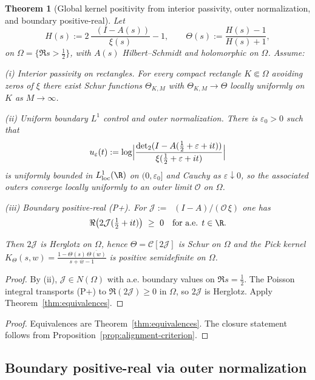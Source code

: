\documentclass[11pt]{article}
\newtheorem{theorem}{Theorem}
\theoremstyle{remark}
\DeclareMathOperator{\dettwo}{det_2}
\begin{document}
\begin{theorem}[Global kernel positivity from interior passivity, outer normalization, and boundary positive-real]\label{thm:global-PSD}
Let
\[
  H(s):=2\,\frac{\dettwo(I-A(s))}{\xi(s)}-1,\qquad
  \Theta(s):=\frac{H(s)-1}{H(s)+1},
\]
on \(\Omega=\{\Re s>\tfrac12\}\), with $A(s)$ Hilbert--Schmidt and holomorphic on \(\Omega\).
Assume:

\emph{(i) Interior passivity on rectangles.} For every compact rectangle $K\Subset\Omega$ avoiding zeros of \(\xi\) there exist Schur functions \(\Theta_{K,M}\) with \(\Theta_{K,M}\to\Theta\) locally uniformly on $K$ as $M\to\infty$.

\emph{(ii) Uniform boundary $L^1$ control and outer normalization.} There is \(\varepsilon_0>0\) such that
\[
  u_\varepsilon(t):=\log\Bigl|\frac{\dettwo(I-A(\tfrac12+\varepsilon+it))}{\xi(\tfrac12+\varepsilon+it)}\Bigr|
\]
is uniformly bounded in $L^1_{\mathrm{loc}}(\R)$ on $(0,\varepsilon_0]$ and Cauchy as \(\varepsilon\downarrow0\), so the associated outers converge locally uniformly to an outer limit \(\mathcal O\) on \(\Omega\).

\emph{(iii) Boundary positive-real (P+).} For \(\mathcal J:=\dettwo(I-A)/(\mathcal O\,\xi)\) one has
\[
 \Re\big(2\mathcal J(\tfrac12+it)\big)\ \ge\ 0\quad\text{for a.e. }t\in\R.
\]

Then \(2\mathcal J\) is Herglotz on \(\Omega\), hence \(\Theta=\mathcal C[2\mathcal J]\) is Schur on \(\Omega\) and the Pick kernel
\(
  K_\Theta(s,w)=\frac{1-\Theta(s)\,\overline{\Theta(w)}}{s+\overline{w}-1}
\)
is positive semidefinite on \(\Omega\).
\end{theorem}
\begin{proof}
By (ii), \(\mathcal J\in N(\Omega)\) with a.e. boundary values on \(\Re s=\tfrac12\). The Poisson integral transports (P+) to \(\Re(2\mathcal J)\ge0\) in \(\Omega\), so \(2\mathcal J\) is Herglotz. Apply Theorem~\ref{thm:equivalences}.
\end{proof}
\begin{proof}
Equivalences are Theorem~\ref{thm:equivalences}. The closure statement follows from Proposition~\ref{prop:alignment-criterion}.
\end{proof}
\subsection{Boundary positive-real via outer normalization}\label{subsec:boundary-unitarity}
\end{document}
